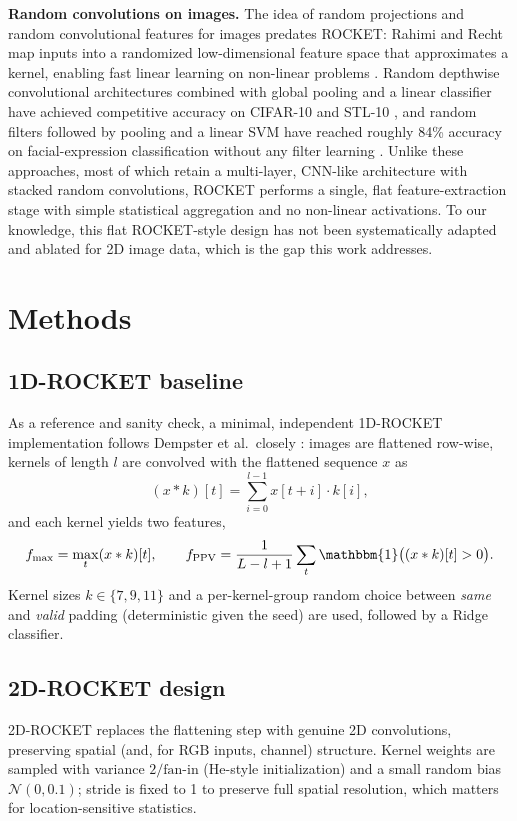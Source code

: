 \documentclass[a4paper,fleqn]{cas-sc}
\begin{document}
\textbf{Random convolutions on images.} The idea of random projections and random convolutional features for images predates ROCKET: Rahimi and Recht map inputs into a randomized low-dimensional feature space that approximates a kernel, enabling fast linear learning on non-linear problems \citep{rahimi2007random}. Random depthwise convolutional architectures combined with global pooling and a linear classifier have achieved competitive accuracy on CIFAR-10 and STL-10 \citep{xue2018random}, and random filters followed by pooling and a linear SVM have reached roughly 84\% accuracy on facial-expression classification without any filter learning \citep{ren2016facial}. Unlike these approaches, most of which retain a multi-layer, CNN-like architecture with stacked random convolutions, ROCKET performs a single, flat feature-extraction stage with simple statistical aggregation and no non-linear activations. To our knowledge, this flat ROCKET-style design has not been systematically adapted and ablated for 2D image data, which is the gap this work addresses.

\section{Methods}\label{sec:methods}

\subsection{1D-ROCKET baseline}
As a reference and sanity check, a minimal, independent 1D-ROCKET implementation follows Dempster et al.\ closely \citep{dempster2020rocket}: images are flattened row-wise, kernels of length $l$ are convolved with the flattened sequence $x$ as
\begin{equation}
(x * k)[t] = \sum_{i=0}^{l-1} x[t+i]\cdot k[i],
\end{equation}
and each kernel yields two features,
\begin{equation}
f_{\text{max}} = \max_t (x*k)[t], \qquad
f_{\text{PPV}} = \frac{1}{L-l+1}\sum_t \mathbbm{1}\big((x*k)[t] > 0\big).
\end{equation}
Kernel sizes $k \in \{7,9,11\}$ and a per-kernel-group random choice between \emph{same} and \emph{valid} padding (deterministic given the seed) are used, followed by a Ridge classifier.

\subsection{2D-ROCKET design}
2D-ROCKET replaces the flattening step with genuine 2D convolutions, preserving spatial (and, for RGB inputs, channel) structure. Kernel weights are sampled with variance $2/\text{fan-in}$ (He-style initialization) and a small random bias $\mathcal{N}(0, 0.1)$; stride is fixed to 1 to preserve full spatial resolution, which matters for location-sensitive statistics.
\end{document}
